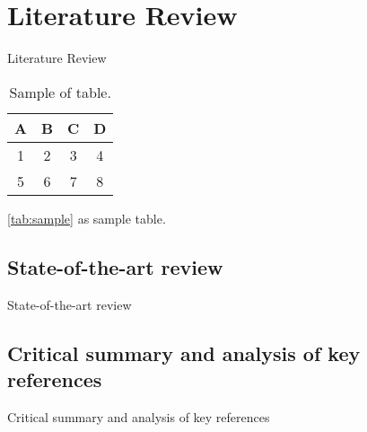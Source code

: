 \chapter{Literature Review}

Literature Review

\begin{table} [h]
\centering
\caption{Sample of table.}
\begin{tabular}{|c|c|c|c|}
\hline
\textbf{A} & \textbf{B} & \textbf{C} & \textbf{D} \\
\hline
1 & 2 & 3 & 4 \\
\hline
5 & 6 & 7 & 8 \\
\hline
\end{tabular}
\label{tab:sample}
\end{table}

\autoref{tab:sample} as sample table.

\section{State-of-the-art review}

State-of-the-art review

\section{Critical summary and analysis of key references}

Critical summary and analysis of key references